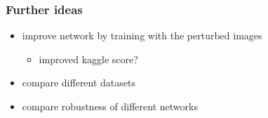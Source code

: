 \documentclass[handout]{beamer}
\begin{document}
\begin{frame}
\frametitle{Further ideas}
\begin{itemize}
\item improve network by training with the perturbed images
\begin{itemize}
\item improved kaggle score?
\end{itemize}
\item compare different datasets
\item compare robustness of different networks
\end{itemize}
\end{frame}
\end{document}
